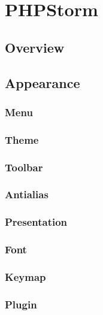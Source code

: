 \part{PHPStorm}


\chapter{Overview}




\chapter{Appearance}

\section{Menu}


\section{Theme}


\section{Toolbar}



\section{Antialias}


\section{Presentation}



\section{Font}



\section{Keymap}



\section{Plugin}



